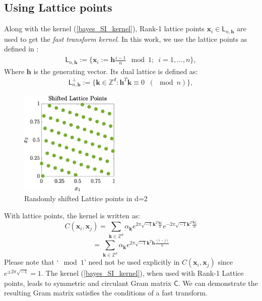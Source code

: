 \documentclass[smallextended]{svjour3}       %
\newcommand{\bm}[1]{\boldsymbol{#1}}
\newcommand{\vh}{\bm{h}}
\newcommand{\vk}{\bm{k}}
\newcommand{\vx}{\bm{x}}
\newcommand{\mC}{\mathsf{C}}
\begin{document}
\subsection{Using Lattice points}
Along with the kernel (\ref{bayes_SI_kernel}), Rank-1 lattice points $\vx_i \in \mathsf{L}_{n,\bm{h}}$ are used to get the \textit{fast transform kernel}. 
In this work, we use the lattice points as defined in \cite{Rank1Lattice}:
\begin{align*}
\mathsf{L}_{n,\bm{h}} := \lbrace \vx_i :=  \bm{h} \frac{ i-1}{n} \mod 1 ;\ \; i=1,\hdots,n
\rbrace,
\end{align*}
Where $\bm{h}$ is the generating vector.
Its dual lattice is defined as:
\begin{align*}
\mathsf{L}_{n,\bm{h}}^{\perp } := 
\lbrace 
\vk \in \mathbb{Z}^d : \vh^T \vk \equiv 0 \;\;  (\mod n)
\rbrace,
\end{align*}



\begin{figure}[htp]
\centering
    \includegraphics[height=5cm]{ShiftedLatticePoints}
    \caption{Randomly shifted Lattice points in d=2  }
\end{figure}






With lattice points, the kernel is written as:
\[
C(\vx_i, \vx_j)
 =
\sum_{\vk \in \mathbb{Z}^d} \alpha_{\vk}  
e^{ 2 \pi\sqrt{-1} \vk^T  \frac{\bm{h} i}{n}}
e^{-2 \pi\sqrt{-1} \vk^T  \frac{\bm{h} j}{n}}
\]
\[
 =
\sum_{\vk \in \mathbb{Z}^d} \alpha_{\vk}  
e^{2 \pi\sqrt{-1} \vk^T \bm{h} \frac{(i-j)}{n}}
\]
Please note that `$\mod 1$' need not be used explicitly in $C(\vx_i, \vx_j)$ since 
$
e^{\pm 2 \pi \sqrt{-1}} = 1
$. 
The kernel (\ref{bayes_SI_kernel}), when used with Rank-1 Lattice points, leads to symmetric and circulant Gram matrix $\mC$.
We can demonstrate the resulting Gram matrix satisfies the conditions of a fast transform. 
\end{document}
